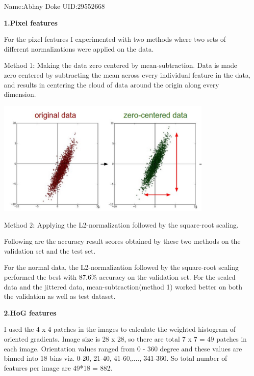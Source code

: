 \documentclass[fleqn]{article}
\begin{document}
{Name:Abhay Doke {UID:29552668}}



\textbf{\huge 1.Pixel features}

For the pixel features I experimented with two methods where two sets of different normalizations were applied on the data. \newline
\vspace{5mm}

Method 1:
Making the data zero centered by mean-subtraction. Data is made zero centered by subtracting the mean across every individual feature in the data, and results in centering the cloud of data around the origin 
along every dimension.  
\begin{center}
\includegraphics[width=0.8\textwidth]{zero_centered.png}
\end{center}

\vspace{10 mm}

Method 2:
Applying the L2-normalization followed by the square-root scaling.

Following are the accuracy result scores obtained by these two methods on the validation set and the test set.


For the normal data, the L2-normalization followed by the square-root scaling performed the best with 87.6\% accuracy on the validation set. For the scaled data and the jittered data, mean-subtraction(method 1) worked better on 
both the validation as well as test dataset.  \newpage


\textbf{\huge 2.HoG features}

I used the 4 x 4 patches in the images to calculate the weighted histogram of oriented gradients. Image size is 28 x 28, so there are total 7 x 7 = 49 patches in each image.
Orientation values ranged from 0 - 360 degree and these values are binned into 18 bins viz. 0-20, 21-40, 41-60,...., 341-360.
So total number of features per image are 49*18 = 882.
\end{document}
